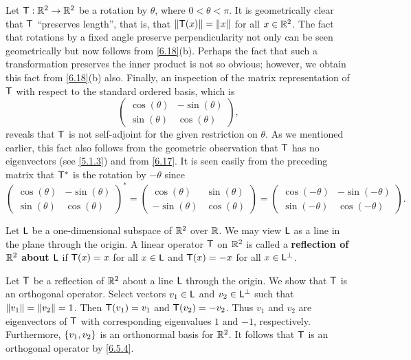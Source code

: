 \begin{eg}\label{6.5.6}
  Let \(\mathsf{T} : \mathbb{R}^2 \to \mathbb{R}^2\) be a rotation by \(\theta\), where \(0 < \theta < \pi\).
  It is geometrically clear that \(\mathsf{T}\) ``preserves length'', that is, that \(\left\lVert\mathsf{T}(x)\right\rVert = \left\lVert x\right\rVert\) for all \(x \in \mathbb{R}^2\).
  The fact that rotations by a fixed angle preserve perpendicularity not only can be seen geometrically but now follows from \cref{6.18}(b).
  Perhaps the fact that such a transformation preserves the inner product is not so obvious;
  however, we obtain this fact from \cref{6.18}(b) also.
  Finally, an inspection of the matrix representation of \(\mathsf{T}\) with respect to the standard ordered basis, which is
  \[
    \begin{pmatrix}
      \cos(\theta) & -\sin(\theta) \\
      \sin(\theta) & \cos(\theta)
    \end{pmatrix},
  \]
  reveals that \(\mathsf{T}\) is not self-adjoint for the given restriction on \(\theta\).
  As we mentioned earlier, this fact also follows from the geometric observation that \(\mathsf{T}\) has no eigenvectors (see \cref{5.1.3}) and from \cref{6.17}.
  It is seen easily from the preceding matrix that \(\mathsf{T}^*\) is the rotation by \(-\theta\) since
  \[
    \begin{pmatrix}
      \cos(\theta) & -\sin(\theta) \\
      \sin(\theta) & \cos(\theta)
    \end{pmatrix}^* = \begin{pmatrix}
      \cos(\theta)  & \sin(\theta) \\
      -\sin(\theta) & \cos(\theta)
    \end{pmatrix} = \begin{pmatrix}
      \cos(-\theta) & -\sin(-\theta) \\
      \sin(-\theta) & \cos(-\theta)
    \end{pmatrix}.
  \]
\end{eg}

\begin{defn}\label{6.5.7}
  Let \(\mathsf{L}\) be a one-dimensional subspace of \(\mathbb{R}^2\) over \(\mathbb{R}\).
  We may view \(\mathsf{L}\) as a line in the plane through the origin.
  A linear operator \(\mathsf{T}\) on \(\mathbb{R}^2\) is called a \textbf{reflection of \(\mathbb{R}^2\) about \(\mathsf{L}\)} if \(\mathsf{T}(x) = x\) for all \(x \in \mathsf{L}\) and \(\mathsf{T}(x) = -x\) for all \(x \in \mathsf{L}^{\perp}\).
\end{defn}

\begin{eg}\label{6.5.8}
  Let \(\mathsf{T}\) be a reflection of \(\mathbb{R}^2\) about a line \(\mathsf{L}\) through the origin.
  We show that \(\mathsf{T}\) is an orthogonal operator.
  Select vectors \(v_1 \in \mathsf{L}\) and \(v_2 \in \mathsf{L}^{\perp}\) such that \(\left\lVert v_1\right\rVert = \left\lVert v_2\right\rVert = 1\).
  Then \(\mathsf{T}(v_1) = v_1\) and \(\mathsf{T}(v_2) = -v_2\).
  Thus \(v_1\) and \(v_2\) are eigenvectors of \(\mathsf{T}\) with corresponding eigenvalues \(1\) and \(-1\), respectively.
  Furthermore, \(\left\lbrace v_1, v_2\right\rbrace\) is an orthonormal basis for \(\mathbb{R}^2\).
  It follows that \(\mathsf{T}\) is an orthogonal operator by \cref{6.5.4}.
\end{eg}

